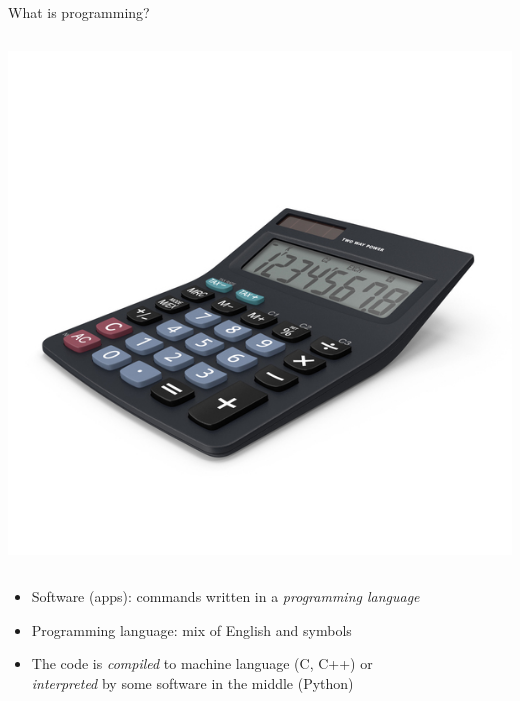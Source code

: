 \documentclass[11pt]{beamer}
\begin{document}
\begin{frame}{What is programming?}
\begin{columns}
      \includegraphics[scale=0.9]{img/calc.jpg}
  \end{columns}
  \begin{itemize}
    \item Software (apps): commands written in a \emph{programming language}
    \item Programming language: mix of English and symbols
    \item The code is \emph{compiled} to machine language (C, C++) or\\
          \emph{interpreted} by some software in the middle (Python)
  \end{itemize}
\end{frame}
\end{document}
